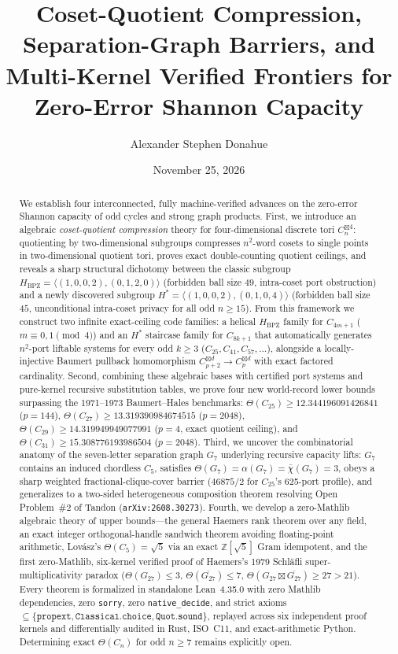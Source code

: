 \documentclass[11pt,reqno]{amsart}
\title[Coset-Quotient Compression and Zero-Error Capacity Frontiers]{%
  Coset-Quotient Compression, Separation-Graph Barriers, and Multi-Kernel Verified Frontiers for Zero-Error Shannon Capacity}
\author{Alexander Stephen Donahue}
\date{November 25, 2026}
\theoremstyle{definition}
\newcommand{\Z}{\mathbb{Z}}
\newcommand{\sprod}{\boxtimes}
\newcommand{\Hbpz}{H_{\mathrm{BPZ}}}
\newcommand{\Hstar}{H^*}
\begin{document}
\begin{abstract}
We establish four interconnected, fully machine-verified advances on the zero-error Shannon capacity of odd cycles and strong graph products.
First, we introduce an algebraic \emph{coset-quotient compression} theory for four-dimensional discrete tori $C_n^{\sprod 4}$: quotienting by two-dimensional subgroups compresses $n^2$-word cosets to single points in two-dimensional quotient tori, proves exact double-counting quotient ceilings, and reveals a sharp structural dichotomy between the classic subgroup $\Hbpz = \langle(1,0,0,2),(0,1,2,0)\rangle$ (forbidden ball size $49$, intra-coset port obstruction) and a newly discovered subgroup $\Hstar = \langle(1,0,0,2),(0,1,0,4)\rangle$ (forbidden ball size $45$, unconditional intra-coset privacy for all odd $n \ge 15$). From this framework we construct two infinite exact-ceiling code families: a helical $\Hbpz$ family for $C_{4m+1}$ ($m \equiv 0,1 \pmod 4$) and an $\Hstar$ staircase family for $C_{8k+1}$ that automatically generates $n^2$-port liftable systems for every odd $k \ge 3$ ($C_{25}, C_{41}, C_{57}, \dots$), alongside a locally-injective Baumert pullback homomorphism $C_{p+2}^{\sprod d} \to C_p^{\sprod d}$ with exact factored cardinality.
Second, combining these algebraic bases with certified port systems and pure-kernel recursive substitution tables, we prove four new world-record lower bounds surpassing the 1971--1973 Baumert--Hales benchmarks:
$\Theta(C_{25}) \ge 12.344196091426841$ ($p=144$),
$\Theta(C_{27}) \ge 13.319390984674515$ ($p=2048$),
$\Theta(C_{29}) \ge 14.319949949077991$ ($p=4$, exact quotient ceiling), and
$\Theta(C_{31}) \ge 15.308776193986504$ ($p=2048$).
Third, we uncover the combinatorial anatomy of the seven-letter separation graph $G_7$ underlying recursive capacity lifts: $G_7$ contains an induced chordless $C_5$, satisfies $\Theta(G_7) = \alpha(G_7) = \bar{\chi}(G_7) = 3$, obeys a sharp weighted fractional-clique-cover barrier ($46875/2$ for $C_{25}$'s 625-port profile), and generalizes to a two-sided heterogeneous composition theorem resolving Open Problem~\#2 of Tandon (\texttt{arXiv:2608.30273}).
Fourth, we develop a zero-Mathlib algebraic theory of upper bounds---the general Haemers rank theorem over any field, an exact integer orthogonal-handle sandwich theorem avoiding floating-point arithmetic, Lovász's $\Theta(C_5)=\sqrt{5}$ via an exact $\Z[\sqrt{5}]$ Gram idempotent, and the first zero-Mathlib, six-kernel verified proof of Haemers's 1979 Schläfli super-multiplicativity paradox ($\Theta(G_{27})\le 3$, $\Theta(\overline{G_{27}})\le 7$, $\Theta(G_{27}\sprod\overline{G_{27}})\ge 27 > 21$).
Every theorem is formalized in standalone Lean~4.35.0 with zero Mathlib dependencies, zero \texttt{sorry}, zero \texttt{native\_decide}, and strict axioms $\subseteq\{\texttt{propext},\texttt{Classical.choice},\texttt{Quot.sound}\}$, replayed across six independent proof kernels and differentially audited in Rust, ISO~C11, and exact-arithmetic Python. Determining exact $\Theta(C_n)$ for odd $n \ge 7$ remains explicitly open.
\end{abstract}
\end{document}

